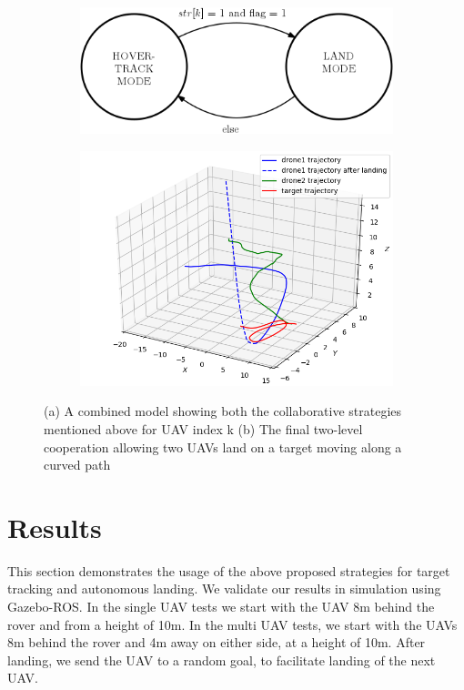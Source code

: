 \documentclass[conf]{new-aiaa}
\begin{document}
\begin{figure}[h]
  \begin{subfigure}{0.5\textwidth}
    \includegraphics[width=\linewidth]{mixed_model.png}
    \caption{} \label{fig:mixed_model}
  \end{subfigure}%
  \hspace*{\fill}   %
  \begin{subfigure}{0.5\textwidth}
    \includegraphics[width=\linewidth]{twist_multi_coord.png}
    \caption{} \label{fig:twist_multi_coord}
  \end{subfigure}%
  \hspace*{\fill}   %
\caption{(a) A combined model showing both the collaborative strategies mentioned above for UAV index k (b) The final two-level cooperation allowing two UAVs land on a target moving along a curved path} \label{fig:model}
\end{figure}

\section{Results}\label{sec:results}
This section demonstrates the usage of the above proposed strategies for target tracking and autonomous landing. We validate our results in simulation using Gazebo-ROS. In the single UAV tests we start with the UAV 8m behind the rover and from a height of 10m. In the multi UAV tests, we start with the UAVs 8m behind the rover and 4m away on either side, at a height of 10m. After landing, we send the UAV to a random goal, to facilitate landing of the next UAV.
\end{document}
